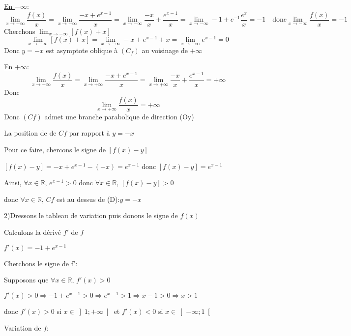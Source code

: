 \documentclass[12pt]{article}
\begin{document}
\underline{En $-\infty$}:
\begin{equation*}
\lim_{x \to -\infty}\frac{f(x)}{x}=\lim_{x \to -\infty}\frac{-x+e^{x-1}}{x}=\lim_{x \to -\infty}\frac{-x}{x}+\frac{e^{x-1}}{x}=\lim_{x \to -\infty}-1+e^{-1}\frac{e^{x}}{x}=-1
\quad\text{donc} \lim_{x \to -\infty}\frac{f(x)}{x}=-1
\end{equation*}
Cherchons $\lim_{x \to -\infty}\left[ f(x)+x\right] $
\[\lim_{x \to -\infty}\left[ f(x)+x\right]=\lim_{x \to -\infty}-x+e^{x-1}+x=\lim_{x \to -\infty}e^{x-1}=0\]
Donc $y=-x$ est asymptote oblique à $(C_{f})$ au voisinage de $+\infty$

\underline{En $+\infty$}:
\[\lim_{x \to +\infty}\frac{f(x)}{x}=\lim_{x \to +\infty}\frac{-x+e^{x-1}}{x}=\lim_{x \to +\infty}\frac{-x}{x}+\frac{e^{x-1}}{x}=+\infty\]
Donc \[\lim_{x \to +\infty}\frac{f(x)}{x}=+\infty\] Donc $(Cf)$ admet une branche parabolique de direction (Oy)

La position de de $Cf$ par rapport à $y=-x$

Pour ce faire, chercons le signe de $\left[ f(x)-y\right] $

$\left[ f(x)-y\right]=-x+e^{x-1}-(-x)=e^{x-1}$ donc $\left[ f(x)-y\right]=e^{x-1}$

Ainsi, $\forall x \in \mathbb{R}$, $e^{x-1}>0$ donc $\forall x \in \mathbb{R}$, $\left[ f(x)-y\right]>0$

donc $\forall x \in \mathbb{R}$, $Cf$ est au dessus de (D):$y=-x$

2)Dressons le tableau de variation puis donons le signe de $f(x)$

Calculons la dérivé $f'$ de $f$

$f'(x)=-1+e^{x-1}$

Cherchons le signe de f':

Supposons que $\forall x \in \mathbb{R}$, $f'(x)>0$

$f'(x)>0 \Longrightarrow -1+e^{x-1}>0 \Longrightarrow e^{x-1}>1 \Longrightarrow x-1>0 \Longrightarrow x>1$ 

donc $f'(x)>0$ si $x\in\left]1; +\infty\right[ $ et $f'(x)<0$ si $x\in\left]-\infty; 1\right[ $

Variation de $f$:
\end{document}
